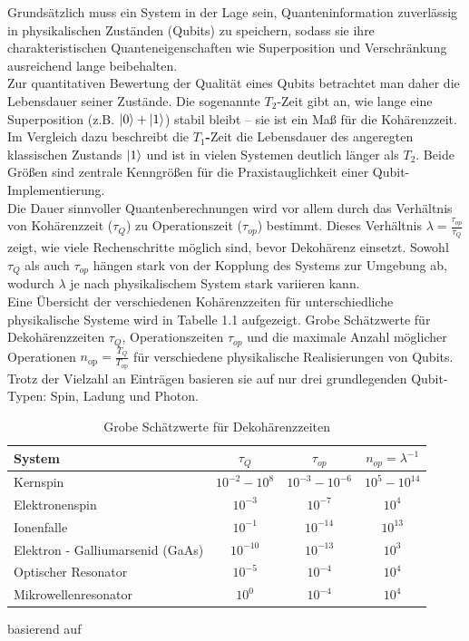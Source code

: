 Grundsätzlich muss ein System in der Lage sein, Quanteninformation zuverlässig in physikalischen Zuständen (Qubits) zu speichern, sodass sie ihre charakteristischen Quanteneigenschaften wie Superposition und Verschränkung ausreichend lange beibehalten. \\
Zur quantitativen Bewertung der Qualität eines Qubits betrachtet man daher die Lebensdauer seiner Zustände. Die sogenannte \textbf{$T_2$}-Zeit gibt an, wie lange eine Superposition (z.B. 
$\ket{0} + \ket{1}$) stabil bleibt – sie ist ein Maß für die Kohärenzzeit. \\
Im Vergleich dazu beschreibt die \textbf{$T_1$-}Zeit die Lebensdauer des angeregten klassischen Zustands $\ket{1}$ und ist in vielen Systemen deutlich länger als $T_2$. Beide Größen sind zentrale Kenngrößen für die Praxistauglichkeit einer Qubit-Implementierung.\\

Die Dauer sinnvoller Quantenberechnungen wird vor allem durch das Verhältnis von Kohärenzzeit (\(\tau_Q\)) zu Operationszeit (\(\tau_{op}\)) bestimmt. Dieses Verhältnis 
\(\lambda = \frac{\tau_{op}}{\tau_Q}\) zeigt, wie viele Rechenschritte möglich sind, bevor Dekohärenz einsetzt. Sowohl \(\tau_Q\) als auch \(\tau_{op}\) hängen stark von der Kopplung des Systems zur Umgebung ab, wodurch \(\lambda\) je nach physikalischem System stark variieren kann. \\

Eine Übersicht der verschiedenen Kohärenzzeiten für unterschiedliche physikalische Systeme wird in Tabelle 1.1 aufgezeigt. Grobe Schätzwerte für Dekohärenzzeiten \(\tau_Q\), Operationszeiten \(\tau_{op}\) und die maximale Anzahl möglicher Operationen  $n_{\text{op}} = \frac{T_Q}{T_{\text{op}}}$  für verschiedene physikalische Realisierungen von Qubits. Trotz der Vielzahl an Einträgen basieren sie auf nur drei grundlegenden Qubit-Typen: Spin, Ladung und Photon. 


\begin{table}[h]
    \centering
    \begin{tabular}{|l|c|c|c|}
        \hline
        \textbf{System} & $\tau_Q$ & $\tau_{op}$ & $n_{op} = \lambda^{-1}$ \\
        \hline
        Kernspin& $10^{-2} - 10^8$ & $10^{-3} - 10^{-6}$ & $10^5 - 10^{14}$ \\
        Elektronenspin& $10^{-3}$ & $10^{-7}$ & $10^4$ \\
        Ionenfalle& $10^{-1}$ & $10^{-14}$ & $10^{13}$ \\
        Elektron - Galliumarsenid (GaAs)& $10^{-10}$ & $10^{-13}$ & $10^3$ \\
        Optischer Resonator& $10^{-5}$ & $10^{-4}$ & $10^4$ \\
        Mikrowellenresonator& $10^{0}$ & $10^{-4}$ & $10^4$ \\
        \hline
    \end{tabular}
    \caption{Grobe Schätzwerte für Dekohärenzzeiten}
    \label{tab:quantum_systems}
\end{table}
basierend auf \cite{nielsen_michael_a_and_isaac_l_chuang_quantum_2010}

